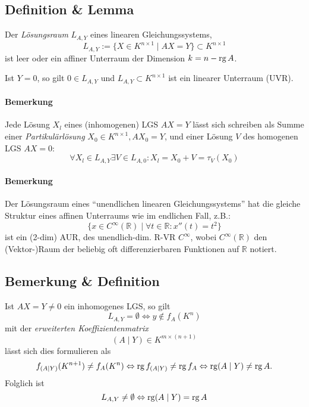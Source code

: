  \subsection{Definition \& Lemma}
 	\begin{Lemma}[Lösungsraum]
 		Der \emph{Lösungsraum} $ L_{A,Y} $ eines linearen Gleichungssystems,
 		\[
 			L_{A,Y}:=\{X\in K^{n\times 1}\mid AX=Y\}\subset K^{n\times 1}
 		\]
 		ist leer oder ein affiner Unterraum der Dimension $ k = n-\operatorname{rg} A $.

 		Ist $ Y = 0 $, so gilt $ 0\in L_{A,Y} $ und $ L_{A,Y}\subset K^{n\times 1} $ ist ein linearer Unterraum (UVR).
 	\end{Lemma}

 	\paragraph{Bemerkung}
 		Jede Lösung $ X_l $ eines (inhomogenen) LGS $AX=Y$ lässt sich schreiben als Summe einer \emph{Partikulärlösung} $ X_0 \in K^{n\times 1},AX_0 = Y $, und einer Lösung $V$ des homogenen LGS $ AX = 0 $:
 		\[
 			\forall X_l\in L_{A,Y}\exists V\in L_{A,0}:X_l=X_0+V=\tau_V(X_0)
 		\]
 	\paragraph{Bemerkung}
 		Der Lösungsraum eines "`unendlichen linearen Gleichungssystems"' hat die gleiche Struktur eines affinen Unterraums wie im endlichen Fall, z.B.:
 		\[
 			\{x\in C^\infty(\mathbb{R})\mid \forall t\in \mathbb{R}:x''(t) = t^2 \}
 		\]
 		ist ein (2-dim) AUR, des unendlich-dim. R-VR $C^\infty$, wobei $ C^\infty(\mathbb{R}) $ den (Vektor-)Raum der beliebig oft differenzierbaren Funktionen auf $ \mathbb{R} $ notiert.
 \subsection{Bemerkung \& Definition}
 	\begin{Definition}
 		Ist $ AX=Y \neq 0$ ein inhomogenes LGS, so gilt
 		\[
 			L_{A,Y} = \emptyset \Leftrightarrow y\notin f_A(K^n)
 		\]
 		mit der \emph{erweiterten Koeffizientenmatrix}
 		\[
 			(A\mid Y) \in K^{m\times (n+1)}
 		\]
 		lässt sich dies formulieren als
 		\[
 			f_{(A\mid Y)}(K^{n+1})\neq f_A(K^n) \Leftrightarrow \operatorname{rg} f_{(A\mid Y)}\neq \operatorname{rg} f_A \Leftrightarrow \operatorname{rg} (A\mid Y) \neq \operatorname{rg} A.
 		\]
 		Folglich ist
 		\[
 			L_{A,Y} \neq \emptyset \Leftrightarrow \operatorname{rg} (A\mid Y) = \operatorname{rg} A
 		\]
 	\end{Definition}
